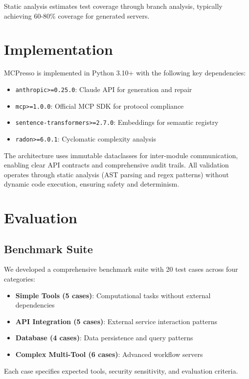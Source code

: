 \documentclass[10pt,twocolumn]{article}
\begin{document}
Static analysis estimates test coverage through branch analysis, typically achieving 60-80\% coverage for generated servers.

\section{Implementation}

MCPresso is implemented in Python 3.10+ with the following key dependencies:
\begin{itemize}
\item \texttt{anthropic>=0.25.0}: Claude API for generation and repair
\item \texttt{mcp>=1.0.0}: Official MCP SDK for protocol compliance
\item \texttt{sentence-transformers>=2.7.0}: Embeddings for semantic registry
\item \texttt{radon>=6.0.1}: Cyclomatic complexity analysis
\end{itemize}

The architecture uses immutable dataclasses for inter-module communication, enabling clear API contracts and comprehensive audit trails. All validation operates through static analysis (AST parsing and regex patterns) without dynamic code execution, ensuring safety and determinism.

\section{Evaluation}

\subsection{Benchmark Suite}

We developed a comprehensive benchmark suite with 20 test cases across four categories:

\begin{itemize}
\item \textbf{Simple Tools (5 cases)}: Computational tasks without external dependencies
\item \textbf{API Integration (5 cases)}: External service interaction patterns
\item \textbf{Database (4 cases)}: Data persistence and query patterns
\item \textbf{Complex Multi-Tool (6 cases)}: Advanced workflow servers
\end{itemize}

Each case specifies expected tools, security sensitivity, and evaluation criteria.
\end{document}

